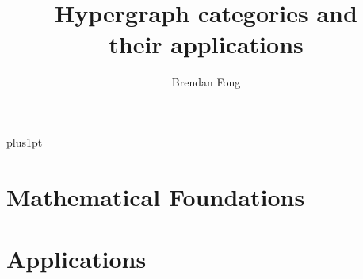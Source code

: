 \documentclass[12pt]{ociamthesis}
\title{Hypergraph categories and \\ their applications}   %
\author{Brendan Fong}
\begin{document}
\baselineskip=18pt plus1pt
\setcounter{secnumdepth}{3} %
\setcounter{tocdepth}{3}

\maketitle                 
 
  
 

\begin{romanpages} 
\tableofcontents

\end{romanpages}



\part{Mathematical Foundations}





\part{Applications}



%

{}
\renewcommand{\bibname}{References} %
\end{document}
